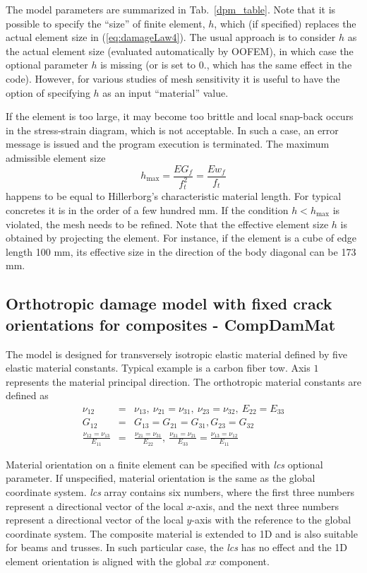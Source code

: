 \documentclass[a4paper]{article}
\newcommand{\param}[1]{{\it #1}}
\begin{document}
The model parameters are summarized
in Tab.~\ref{dpm_table}. Note that it is possible to specify the ``size'' of finite element, $h$, which (if specified) replaces
the actual element size in  (\ref{eq:damageLaw4}). The usual approach is to consider $h$ as the actual element size (evaluated automatically by OOFEM), 
in which case the optional
parameter $h$ is missing (or is set to 0., which has the same effect in the code). However, for various studies of mesh sensitivity
it is useful to have the option of  specifying $h$ as an input ``material'' value.

If the element is too large, it may become too brittle and local snap-back
occurs in the stress-strain diagram, which is not acceptable. 
In such a case, an error message is issued and the program execution
is terminated. The maximum admissible element size 
\begin{equation}
h_{\max} = \frac{EG_f}{f_t^2} = \frac{Ew_f}{f_t}
\end{equation}
happens to be equal to Hillerborg's characteristic material length. 
For typical concretes it is in the order of a few hundred mm. 
If the condition $h<h_{\max}$ is violated, the mesh needs to be refined.
Note that the effective element size $h$ is obtained by projecting the element.
For instance, if the element is a cube of edge length 100 mm, its effective
size in the direction of the body diagonal can be 173 mm. 

\subsection{Orthotropic damage model with fixed crack orientations for composites - CompDamMat}

The model is designed for transversely isotropic elastic material defined by five elastic material constants. Typical example is a carbon fiber tow. Axis $1$ represents the material principal direction. The orthotropic material constants are defined as
\begin{eqnarray}
\nu_{12}&=&\nu_{13},~\nu_{21}=\nu_{31},~\nu_{23}=\nu_{32},~E_{22}=E_{33}\\
G_{12}&=&G_{13}=G_{21}=G_{31},G_{23}=G_{32}\\
\frac{\nu_{12}=\nu_{13}}{E_{11}} &=& \frac{\nu_{21}=\nu_{31}}{E_{22}},~\frac{\nu_{31}=\nu_{21}}{E_{33}} = \frac{\nu_{13}=\nu_{12}}{E_{11}}
\end{eqnarray}

Material orientation on a finite element can be specified with \param{lcs} optional parameter. If unspecified, material orientation is the same as the global coordinate system. \param{lcs} array contains six numbers,
where the first three numbers represent a directional vector of the local $x$-axis, and the next three numbers represent a directional vector of the local $y$-axis with the reference to the global coordinate system. The composite material is extended to 1D and is also suitable for beams and trusses. In such particular case, the \param{lcs} has no effect and the 1D element orientation is aligned with the global $xx$ component.
\end{document}
